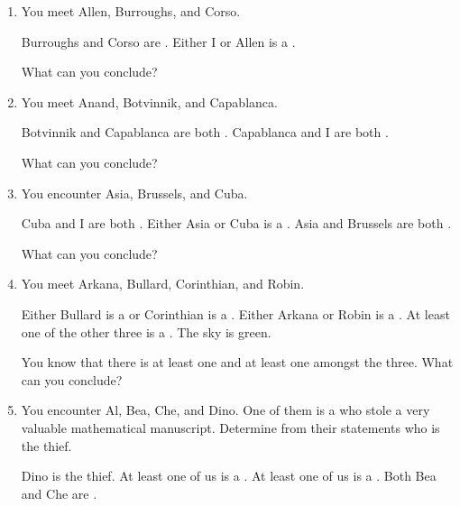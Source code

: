 \probsec{~\ref{sec:conjunctions}}
\begin{enumerate}
    \item You meet Allen, Burroughs, and Corso.
  \begin{dialogue}
     Burroughs and Corso are  \knights.
     Either I or Allen is a \knave.
  \end{dialogue}
  What can you conclude?

    \item You meet Anand, Botvinnik, and Capablanca.
  \begin{dialogue}
     Botvinnik and Capablanca are both \knaves.
     Capablanca and I are both \knaves.
  \end{dialogue}
  What can you conclude?

    \item You encounter Asia, Brussels, and Cuba.
  \begin{dialogue}
     Cuba and I are both \knights.
     Either Asia or Cuba is a \knave.
     Asia and Brussels are both \knaves.
  \end{dialogue}
  What can you conclude?

  \item You meet Arkana, Bullard, Corinthian, and Robin.
  \begin{dialogue}
     Either Bullard is a \knight or Corinthian is a \knave.
     Either Arkana or Robin is a \knave.
     At least one of the other three is a \knave.
     The sky is green.
  \end{dialogue}
  You know that there is at least one \knight and at least one \knave amongst the three. What can you conclude?

  \item You encounter Al, Bea, Che, and Dino. One of them is a \knave who stole a very valuable mathematical manuscript. Determine from their statements who is the thief.
  \begin{dialogue}
     Dino is the thief.
     At least one of us is a \knight.
     At least one of us is a \knave.
     Both Bea and Che are \knights.
  \end{dialogue}

\end{enumerate}
